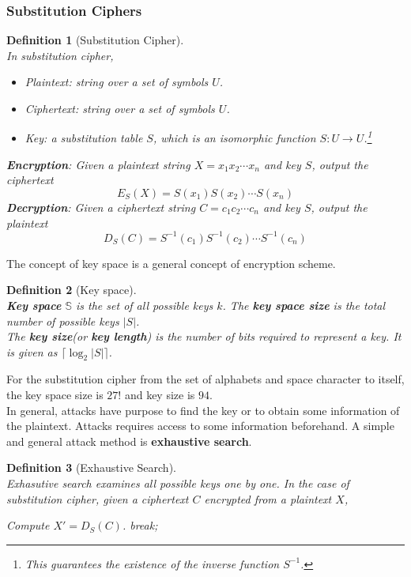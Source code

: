 \documentclass[12pt]{article}
\newtheorem{definition}{Definition}[section]
\theoremstyle{definition}
\begin{document}
\subsubsection{Substitution Ciphers}
\begin{definition}[Substitution Cipher]
\hfill\\\normalfont In substitution cipher, 
\begin{itemize}
  \item Plaintext: string over a set of symbols $U$.
  \item Ciphertext: string over a set of symbols $U$.
  \item Key: a substitution table $S$, which is an isomorphic function $S:U\to U$.\footnote{This guarantees the existence of the inverse function $S^{-1}$.}
\end{itemize}
\textbf{Encryption}: Given a plaintext string $X=x_1x_2\cdots x_n$ and key $S$, output the ciphertext
\[
E_S(X)=S(x_1)S(x_2)\cdots S(x_n)
\]
\textbf{Decryption}: Given a ciphertext string $C=c_1c_2\cdots c_n$ and key $S$, output the plaintext
\[
D_S(C)=S^{-1}(c_1)S^{-1}(c_2)\cdots S^{-1}(c_n)
\]
\end{definition}
The concept of key space is a general concept of encryption scheme.
\begin{definition}[Key space]
\hfill\\\normalfont \textbf{Key space} $\mathbb{S}$ is the set of all possible keys $k$. The \textbf{key space size} is the total number of possible keys $|S|$.\\
The \textbf{key size}(or \textbf{key length}) is the number of bits required to represent a key. It is given as $\lceil\log_2|S|\rceil$.
\end{definition}
For the substitution cipher from the set of alphabets and space character to itself, the key space size is $27!$ and key size is $94$.\\
In general, attacks have purpose to find the key or to obtain some information of the plaintext. Attacks requires access to some information beforehand. A simple and general attack method is \textbf{exhaustive search}.
\begin{definition}[Exhaustive Search]
\hfill\\\normalfont Exhasutive search examines all possible keys one by one. In the case of substitution cipher, given a ciphertext $C$ encrypted from a plaintext $X$,
\begin{algorithm}
\begin{algorithmic}
  Compute $X'=D_S(C)$.
 break; \EndIf
\end{algorithmic}
\end{algorithm}
\end{definition}
\end{document}
